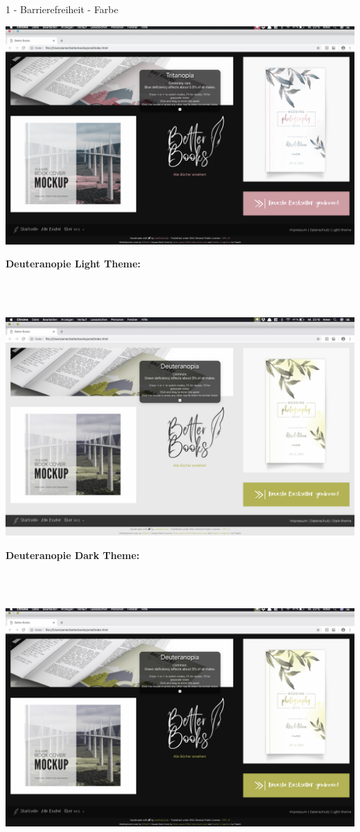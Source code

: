 \documentclass[a4paper]{article}
\begin{document}
\begin{exercise}{1 - Barrierefreiheit - Farbe}
\begin{center}
 \includegraphics[scale=0.2]{../7_bookstore_main_tritanomalie_dark.png}
 \end{center}
\begin{Large}
\newpage
\textbf{Deuteranopie Light Theme:}
\end{Large}\\\\
\begin{center}
 \includegraphics[scale=0.2]{../8_bookstore_main_deuteranopie_light.png}
 \end{center}
\begin{Large}
\textbf{Deuteranopie Dark Theme:}
\end{Large}\\\\
\begin{center}
 \includegraphics[scale=0.2]{../9_bookstore_main_deuteranopie_dark.png}

\end{center}
\end{exercise}
\end{document}
